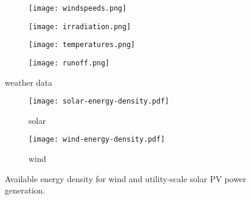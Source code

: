 \begin{figure}
    \centering
        \begin{subfigure}[t]{0.49\textwidth}
            \centering
        \texttt{[image: windspeeds.png]}
    \end{subfigure}
    \begin{subfigure}[t]{0.49\textwidth}
        \centering
        \texttt{[image: irradiation.png]}
    \end{subfigure}
    \begin{subfigure}[t]{0.49\textwidth}
        \centering
        \texttt{[image: temperatures.png]}
    \end{subfigure}
    \begin{subfigure}[t]{0.49\textwidth}
        \centering
        \texttt{[image: runoff.png]}
    \end{subfigure}
    \caption{weather data}
    \label{fig:weather-data}
\end{figure}

\begin{figure}
    \centering
    \begin{subfigure}[t]{0.49\textwidth}
        \centering
        \caption{solar}
        \texttt{[image: solar-energy-density.pdf]}
    \end{subfigure}
    \begin{subfigure}[t]{0.49\textwidth}
        \centering
        \caption{wind}
        \texttt{[image: wind-energy-density.pdf]}
    \end{subfigure}
    \caption{Available energy density for wind and utility-scale solar PV power generation.}
    \label{fig:energy-density}
\end{figure}

